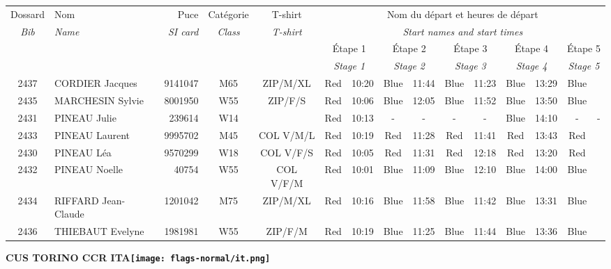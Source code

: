 \documentclass{report}
\begin{document}
  \begin{longtable}{|c|l|r|c|c|*{5}{cc|}}
    Dossard & Nom  & Puce    & Catégorie & T-shirt & \multicolumn{10}{c|}{Nom du départ et heures de départ} \\
    \itshape Bib     & \itshape Name & \itshape SI card & \itshape Class  & \itshape  T-shirt  & \multicolumn{10}{c|}{\itshape Start names and start times} \\
    \hline
    & & & & & \multicolumn{2}{c|}{Étape 1} & \multicolumn{2}{c|}{Étape 2} & \multicolumn{2}{c|}{Étape 3} & \multicolumn{2}{c|}{Étape 4} & \multicolumn{2}{c|}{Étape 5} \\
    & & & & & \multicolumn{2}{c|}{\itshape Stage 1} & \multicolumn{2}{c|}{\itshape Stage 2} & \multicolumn{2}{c|}{\itshape Stage 3} & \multicolumn{2}{c|}{\itshape Stage 4} & \multicolumn{2}{c|}{\itshape Stage 5} \\
    \hline
    2437 & CORDIER Jacques & 9141047 & M65 & ZIP/M/XL & Red & 10:20 & Blue & 11:44 & Blue & 11:23 & Blue & 13:29 & Blue &  \\
    2435 & MARCHESIN Sylvie & 8001950 & W55 & ZIP/F/S & Red & 10:06 & Blue & 12:05 & Blue & 11:52 & Blue & 13:50 & Blue &  \\
    2431 & PINEAU Julie & 239614 & W14 &   & Red & 10:13 & - &  - & - &  - & Blue & 14:10 & - &  -\\
    2433 & PINEAU Laurent & 9995702 & M45 & COL V/M/L & Red & 10:19 & Red & 11:28 & Red & 11:41 & Red & 13:43 & Red &  \\
    2430 & PINEAU Léa & 9570299 & W18 & COL V/F/S & Red & 10:05 & Red & 11:31 & Red & 12:18 & Red & 13:20 & Red &  \\
    2432 & PINEAU Noelle & 40754 & W55 & COL V/F/M & Red & 10:01 & Blue & 11:09 & Blue & 12:10 & Blue & 14:00 & Blue &  \\
    2434 & RIFFARD Jean-Claude & 1201042 & M75 & ZIP/M/XL & Red & 10:16 & Blue & 11:58 & Blue & 11:42 & Blue & 13:31 & Blue &  \\
    2436 & THIEBAUT Evelyne & 1981981 & W55 & ZIP/F/M & Red & 10:19 & Blue & 11:25 & Blue & 11:44 & Blue & 13:36 & Blue &  \\
  \end{longtable}
\newpage
  \Huge \centering \bfseries CUS TORINO CCR  ITA\normalfont \footnotesize \sffamily \hfill \texttt{[image: flags-normal/it.png]} \newline 
\end{document}

